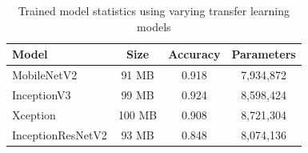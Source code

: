 \documentclass[twocolumn]{article}
\begin{document}
\begin{table}[h]
\begin{tabular}{ |l|c|c|c| }
  \hline
  \textbf{Model} & \textbf{Size} & \textbf{Accuracy} & \textbf{Parameters} \\ \hline
  MobileNetV2 & 91 MB & 0.918 & 7,934,872 \\ \hline
  InceptionV3 & 99 MB & 0.924 & 8,598,424 \\ \hline
  Xception & 100 MB & 0.908 & 8,721,304 \\ \hline
  InceptionResNetV2 & 93 MB & 0.848 & 8,074,136 \\
  \hline
\end{tabular}
\caption{Trained model statistics using varying transfer learning models}
\end{table}

\clearpage
\end{document}

